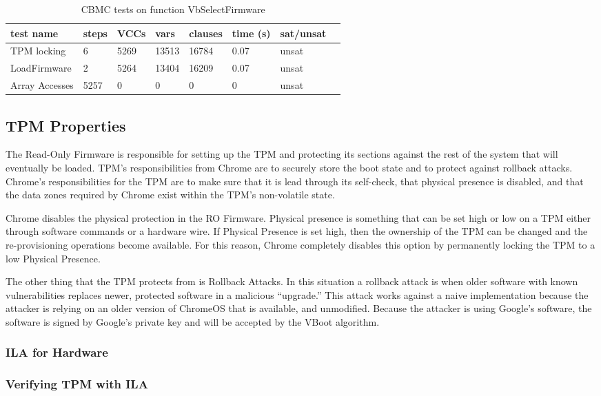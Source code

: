 \documentclass[../report.tex]{subfiles}
\begin{document}
\begin{table}[]
    \centering
    \caption{CBMC tests on function VbSelectFirmware}\label{sfw_results}
    \begin{tabular}{|l|l|l|l|l|l|l|l|}
        \hline
        test name & steps & VCCs & vars  & clauses & time (s) & sat/unsat  \\ \hline \hline
        TPM locking & 6 & 5269 & 13513 & 16784 & 0.07 & unsat \\ \hline
        LoadFirmware & 2 & 5264 & 13404 & 16209 & 0.07 & unsat \\ \hline
        Array Accesses & 5257 & 0 & 0 & 0 & 0 &  unsat \\ \hline
    \end{tabular}
\end{table}

\subsection{TPM Properties}

The Read-Only Firmware is responsible for setting up the TPM and protecting its
sections against the rest of the system that will eventually be loaded.
TPM's responsibilities from Chrome are to securely store the boot state and to protect against rollback attacks. 
Chrome's responsibilities for the TPM are to make sure that it is lead through
its self-check, that physical presence is disabled, and that the data zones
required by Chrome exist within the TPM's non-volatile state.

Chrome disables the physical protection in the RO Firmware.
Physical presence is something that can be set high or low on a TPM either through software commands or a hardware wire. 
If Physical Presence is set high, then the ownership of the TPM can be changed and the re-provisioning operations become available.
For this reason, Chrome completely disables this option by permanently locking the TPM to a low Physical Presence\@.

The other thing that the TPM protects from is Rollback Attacks.
In this situation a rollback attack is when older software with known
vulnerabilities replaces newer, protected software in a malicious ``upgrade.''
This attack works against a naive implementation because the attacker is relying on an older version of ChromeOS that is available, and unmodified.
Because the attacker is using Google's software, the software is signed by Google's private key and will be accepted by the VBoot algorithm.

\subsubsection{ILA for Hardware}   

\subsubsection{Verifying TPM with ILA}   
\clearpage
\end{document}
